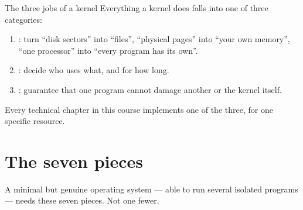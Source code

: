 \begin{concept}{The three jobs of a kernel}
Everything a kernel does falls into one of three categories:
\begin{enumerate}
  \item {}: turn ``disk sectors'' into ``files'', ``physical pages'' into ``your
        own memory'', ``one processor'' into ``every program has its own''.
  \item {}: decide who uses what, and for how long.
  \item {}: guarantee that one program cannot damage another or the kernel itself.
\end{enumerate}
Every technical chapter in this course implements one of the three, for one specific resource.
\end{concept}

\section{The seven pieces}

A minimal but genuine operating system --- able to run several isolated programs --- needs these
seven pieces. Not one fewer.

